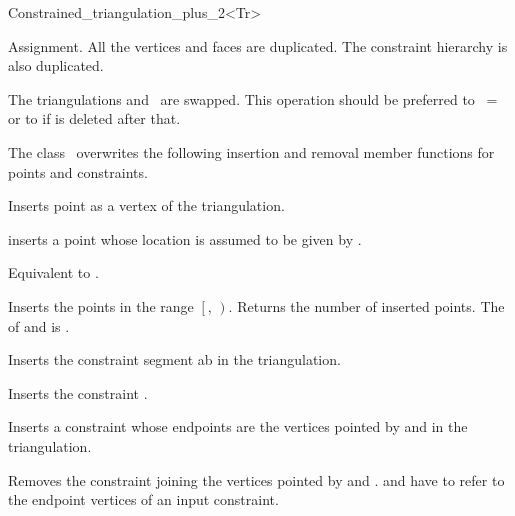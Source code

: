 \begin{ccRefClass}{Constrained_triangulation_plus_2<Tr>}




{Assignment. All the vertices and faces are duplicated.
 The constraint hierarchy is also duplicated.}

{The triangulations  and \ccVar\ are swapped.
This operation should be preferred to \ccVar\ =  or to
 if  is deleted after that.}

The class \ccRefName\ overwrites the following insertion and removal
member functions for points and constraints.

{Inserts point  as a vertex of the triangulation.}

{inserts a point  whose location is assumed 
to be given by .}

{Equivalent to .}

{Inserts the points in the range
 $\left[\right.$, $\left.\right)$.
 Returns the number of inserted points.
 \ccPrecond The  of  and 
 is .}

{Inserts the constraint segment ab in the triangulation. }

{Inserts the constraint .}

{ Inserts a constraint whose endpoints are the vertices 
pointed by  and  in the triangulation. }

{Removes the constraint  joining the vertices pointed by  and .
\ccPrecond {} and  have to refer to  the endpoint vertices
of an  input constraint.}



\end{ccRefClass}
